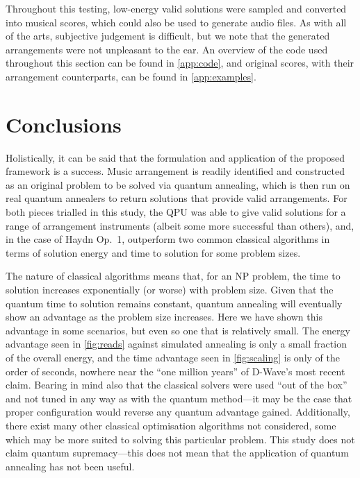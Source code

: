 \documentclass[12pt]{article}
\theoremstyle{definition}
\begin{document}
Throughout this testing, low-energy valid solutions were sampled and converted into musical scores, which could also be used to generate audio files. As with all of the arts, subjective judgement is difficult, but we note that the generated arrangements were not unpleasant to the ear.
An overview of the code used throughout this section can be found in \cref{app:code}, and original scores, with their arrangement counterparts, can be found in \cref{app:examples}.

\section{Conclusions}

Holistically, it can be said that the formulation and application of the proposed framework is a success. Music arrangement is readily identified and constructed as an original problem to be solved via quantum annealing, which is then run on real quantum annealers to return solutions that provide valid arrangements. For both pieces trialled in this study, the QPU was able to give valid solutions for a range of arrangement instruments (albeit some more successful than others), and, in the case of Haydn Op.\ 1, outperform two common classical algorithms in terms of solution energy and time to solution for some problem sizes.

The nature of classical algorithms means that, for an NP problem, the time to solution increases exponentially (or worse) with problem size. Given that the quantum time to solution remains constant, quantum annealing will eventually show an advantage as the problem size increases. Here we have shown this advantage in some scenarios, but even so one that is relatively small. The energy advantage seen in \cref{fig:reads} against simulated annealing is only a small fraction of the overall energy, and the time advantage seen in \cref{fig:scaling} is only of the order of seconds, nowhere near the ``one million years'' of D-Wave's most recent claim. Bearing in mind also that the classical solvers were used ``out of the box'' and not tuned in any way as with the quantum method---it may be the case that proper configuration would reverse any quantum advantage gained. Additionally, there exist many other classical optimisation algorithms not considered, some which may be more suited to solving this particular problem. This study does not claim quantum supremacy---this does not mean that the application of quantum annealing has not been useful.
\end{document}
